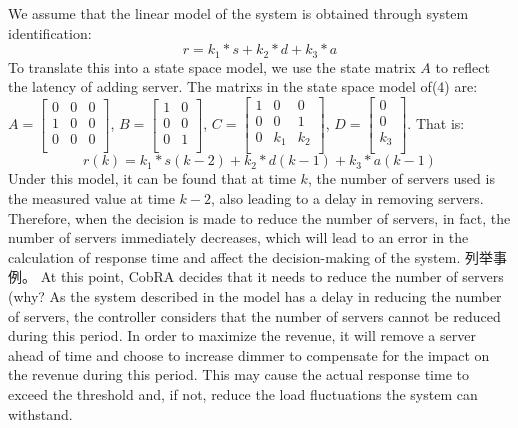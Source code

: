 \documentclass[sigconf]{acmart}
\begin{document}
We assume that the linear model of the system is obtained through system identification:
\begin{equation}
	r=k_1 *s+k_2 *d+k_3*a
\end{equation}
To translate this into a state space model, we use the state matrix $A$ to reflect the latency of adding server. The matrixs in the state space model of(4) are:
$A={\left[\begin{array}{ccc}
	0&0&0\\
	1&0&0\\
	0&0&0\\
	\end{array}
	\right]
}$, $B={\left[\begin{array}{ccc}
1&0\\0&0\\
0&1\\
\end{array}
\right]}$, $C={\left[\begin{array}{ccc}
1&0&0\\
0&0&1\\
0&k_1&k_2\\
\end{array}
\right]
}$, $D={\left[\begin{array}{ccc}
0\\
0\\
k_3\\
\end{array}
\right]
}$.
That is: 
\begin{equation}
r(k)=k_1 *s(k-2)+k_2 *d(k-1)+k_3*a(k-1)
\end{equation}
Under this model, it can be found that at time $k$, the number of servers used is the measured value at time $k-2$, also leading to a delay in removing servers.
Therefore, when the decision is made to reduce the number of servers, in fact, the number of servers immediately decreases, which will lead to an error in the calculation of response time and affect the decision-making of the system.
列举事例。
At this point, CobRA decides that it needs to reduce the number of servers (why?
As the system described in the model has a delay in reducing the number of servers, the controller considers that the number of servers cannot be reduced during this period. In order to maximize the revenue, it will remove a server ahead of time and choose to increase dimmer to compensate for the impact on the revenue during this period.
This may cause the actual response time to exceed the threshold and, if not, reduce the load fluctuations the system can withstand.
\end{document}

